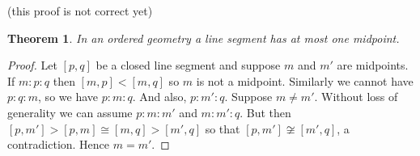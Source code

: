 \documentclass[12pt]{article}
\newtheorem{thm}{Theorem}
\begin{document}
(this proof is not correct yet)
\begin{thm} In an ordered geometry a line segment has at most one midpoint.
\end{thm}
\begin{proof}
Let $[p,q]$ be a closed line segment and suppose $m$ and $m'$ are midpoints.
If $m:p:q$ then $[m,p] < [m,q]$ so $m$ is not a midpoint. Similarly we cannot have
$p:q:m$, so we have $p:m:q$. And also, $p:m':q$. Suppose $m \not = m'$. Without loss of
generality we can assume $p:m:m'$ and $m:m':q$. But then $[p,m'] > [p,m] \cong [m,q] > [m',q]$ so that
$[p,m'] \not \cong [m',q]$, a contradiction. Hence $m = m'$.
\end{proof}

\end{document}
